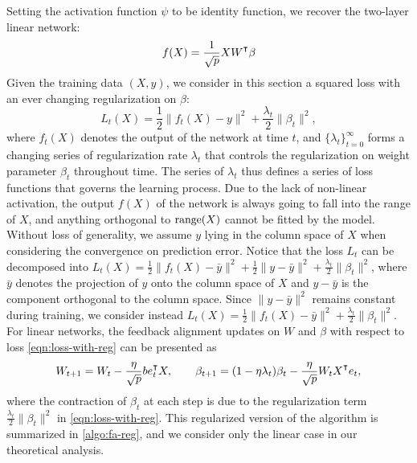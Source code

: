 Setting the activation function $\psi$ to be identity function, we recover the two-layer linear network: 
\begin{align}\label{eqn:linear-network}
    f(X) = \frac{1}{\sqrt p}XW\transpose\beta
\end{align}
Given the training data $(X,y)$, we consider in this section a squared loss with an ever changing regularization on $\beta$:
\begin{equation}\label{eqn:loss-with-reg}
    L_t(X) = \frac{1}{2}\|f_t(X) - y\|^2 + \frac{\lambda_t}{2}\|\beta_t\|^2,
\end{equation}
where $f_t(X)$ denotes the output of the network at time $t$, and $\{\lambda_t\}_{t=0}^\infty$ forms a changing series of regularization rate $\lambda_t$ that controls the regularization on weight parameter $\beta_t$ throughout time. The series of $\lambda_t$ thus defines a series of loss functions that governs the learning process. Due to the lack of non-linear activation, the output $f(X)$ of the network is always going to fall into the range of $X$, and anything orthogonal to $\operatorname{\mathrm{range}}(X)$ cannot be fitted by the model. Without loss of generality, we assume $y$ lying in the column space of $X$ when considering the convergence on prediction error.
Notice that the loss $L_t$ can be decomposed into $L_t(X) = \frac{1}{2}\|f_t(X) - \bar y\|^2 + \frac{1}{2}\|y - \bar y\|^2 + \frac{\lambda_t}{2}\|\beta_t\|^2$, where $\bar y$ denotes the projection of $y$ onto the column space of $X$ and $y-\bar y$ is the component orthogonal to the column space. Since $\|y - \bar y\|^2$ remains constant during training, we consider instead $L_t(X) = \frac{1}{2}\|f_t(X) - \bar y\|^2 + \frac{\lambda_t}{2}\|\beta_t\|^2$.
For linear networks, the feedback alignment updates on $W$ and $\beta$ with respect to loss \eqref{eqn:loss-with-reg} can be presented as
\begin{align}\label{eqn:update-reg}
    W_{t+1} = W_t - \frac{\eta}{\sqrt p}b e_t\transpose X, \qquad \beta_{t+1} = (1-\eta\lambda_t)\beta_t - \frac{\eta}{\sqrt p} W_tX\transpose e_t, 
\end{align}
where the contraction of $\beta_t$ at each step is due to the regularization term $\frac{\lambda_t}{2}\|\beta_t\|^2$ in \eqref{eqn:loss-with-reg}. This regularized version of the algorithm is summarized in \cref{algo:fa-reg}, and we consider only the linear case in our theoretical analysis.

